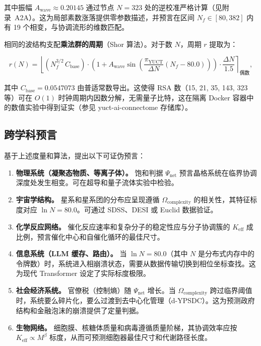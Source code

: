 \documentclass[12pt,a4paper]{article}
\theoremstyle{remark}
\newcommand{\Keff}{K_{\mathrm{eff}}}
\newcommand{\piYUCT}{\pi_{\mathrm{YUCT}}}
\begin{document}
	其中振幅 \(A_{\text{wave}} \approx 0.20145\) 通过节点 \(N=323\) 处的逆校准严格计算（见附录~A2A）。这为局部素数涨落提供零参数描述，并预言在区间 \(N_f \in [80, 382]\) 内有 19 个相变，与协调流形的维数匹配。
	
	相同的波结构支配\textbf{乘法群的周期}（Shor 算法）。对于数 \(N\)，周期 \(r\) 提取为：
	
	\begin{equation}
		r(N) = \left\lfloor (N_f^{3/2} \, C_{\text{base}}) \cdot
		\left(1 + A_{\text{wave}} \sin\left( \frac{\piYUCT}{\Delta N} (N_f - 80.0) \right) \right) \cdot \frac{\Delta N}{1.5} \right\rceil_{\text{偶数}},
		\label{eq:shor_period}
	\end{equation}
	
	其中 \(C_{\text{base}} = 0.0547073\) 由普适常数导出。这使得 RSA 数（15, 21, 35, 143, 323 等）可在 \(O(1)\) 时钟周期内因数分解，无需量子比特，这在隔离 Docker 容器中的数值实验中得到证实（参见 yuct-ai-connectome 存储库）。
	
	\subsection{跨学科预言}
	\label{subsec:predictions-complexity}
	
	基于上述度量和算法，提出以下可证伪预言：
	
	\begin{enumerate}[label=(\arabic*)]
		\item \textbf{物理系统（凝聚态物质、等离子体）。} 饱和判据 \(\Psi_{\mathrm{net}}\) 预言晶格系统在临界协调深度处发生相变。可在超导和量子流体实验中检验。
		\item \textbf{宇宙学结构。} 星系和星系团的分布应呈现遵循 \(\Omega_{\mathrm{complexity}}\) 的相关性，其特征标度对应 \(\ln N = 80.0\)。可通过 SDSS、DESI 或 Euclid 数据验证。
		\item \textbf{化学反应网络。} 催化反应速率和复杂分子的稳定性应与分子协调簇的 \(\Keff\) 成比例，预言催化中心和自催化循环的最佳尺寸。
		\item \textbf{信息系统（LLM 缓存、路由）。} 当 \(\ln N = 80.0\)（其中 \(N\) 是分布式内存中的令牌数）时，系统进入相崩溃状态，需要从数据传输切换到相位坐标查找。这为现代 Transformer 设定了实际标度极限。
		\item \textbf{社会经济系统。} 官僚税（控制熵）随 \(\Psi_{\mathrm{net}}\) 增长。当 \(\Omega_{\mathrm{complexity}}\) 跨过临界阈值时，系统要么碎片化，要么过渡到去中心化管理（d-YPSDC）。这为预测政府结构和金融泡沫的崩溃提供了定量判据。
		\item \textbf{生物网络。} 细胞膜、核糖体质量和病毒遵循质量阶梯，其协调效率应按 \(\Keff \propto M^{\beta}\) 标度，从而可预测细胞器最佳尺寸和代谢路径长度。
	\end{enumerate}
	
\end{document}

